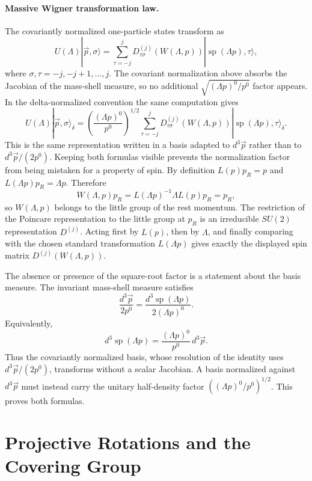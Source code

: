 \paragraph{Massive Wigner transformation law.}
The covariantly normalized one-particle states transform as
\[
  U(\Lambda)|\vec p,\sigma\rangle
  =
  \sum_{\tau=-j}^{j}
  D^{(j)}_{\tau\sigma}\!\left(W(\Lambda,p)\right)
  |\operatorname{sp}(\Lambda p),\tau\rangle ,
\]
where \(\sigma,\tau=-j,-j+1,\ldots,j\). The covariant normalization above
absorbs the Jacobian of the mass-shell measure, so no additional
\(\sqrt{(\Lambda p)^0/p^0}\) factor appears.
In the delta-normalized convention the same computation gives
\[
  U(\Lambda)|\vec p,\sigma\rangle_\delta
  =
  \left(\frac{(\Lambda p)^0}{p^0}\right)^{1/2}
  \sum_{\tau=-j}^{j}
  D^{(j)}_{\tau\sigma}\!\left(W(\Lambda,p)\right)
  |\operatorname{sp}(\Lambda p),\tau\rangle_\delta .
\]
This is the same representation written in a basis adapted to
\(d^3\vec p\) rather than to \(d^3\vec p/(2p^0)\). Keeping both formulas
visible prevents the normalization factor from being mistaken for a property
of spin.
By definition \(L(p)p_R=p\) and \(L(\Lambda p)p_R=\Lambda p\). Therefore
\[
  W(\Lambda,p)p_R
  =
  L(\Lambda p)^{-1}\Lambda L(p)p_R
  =
  p_R ,
\]
so \(W(\Lambda,p)\) belongs to the little group of the rest momentum.  The
restriction of the Poincare representation to the little group at \(p_R\) is an
irreducible \(SU(2)\) representation \(D^{(j)}\).  Acting first by \(L(p)\),
then by \(\Lambda\), and finally comparing with the chosen standard
transformation \(L(\Lambda p)\) gives exactly the displayed spin matrix
\(D^{(j)}(W(\Lambda,p))\).

The absence or presence of the square-root factor is a statement about the
basis measure.  The invariant mass-shell measure satisfies
\[
  \frac{d^3\vec p}{2p^0}
  =
  \frac{d^3\operatorname{sp}(\Lambda p)}{2(\Lambda p)^0}.
\]
Equivalently,
\[
  d^3\operatorname{sp}(\Lambda p)
  =
  \frac{(\Lambda p)^0}{p^0}\,d^3\vec p .
\]
Thus the covariantly normalized basis, whose resolution of the identity uses
\(d^3\vec p/(2p^0)\), transforms without a scalar Jacobian.  A basis
normalized against \(d^3\vec p\) must instead carry the unitary half-density
factor \(((\Lambda p)^0/p^0)^{1/2}\).  This proves both formulas.

\section{Projective Rotations and the Covering Group}
\label{sec:massive-spin-projective-cover}


